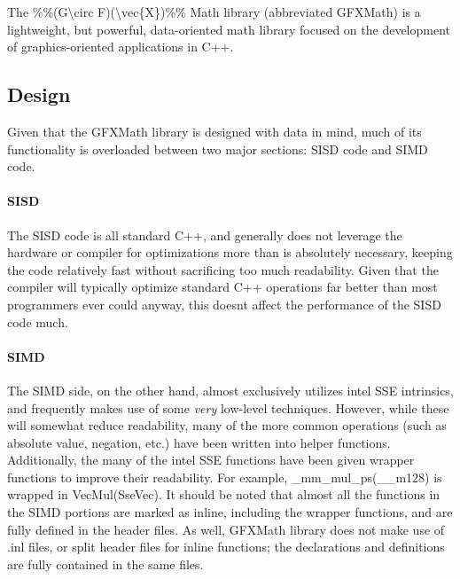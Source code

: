 The \%\%(G\textbackslash{}circ F)(\textbackslash{}vec\{X\})\%\% Math library (abbreviated G\+F\+X\+Math) is a lightweight, but powerful, data-\/oriented math library focused on the development of graphics-\/oriented applications in C++.

\subsection*{Design}





Given that the G\+F\+X\+Math library is designed with data in mind, much of its functionality is overloaded between two major sections\+: S\+I\+S\+D code and S\+I\+M\+D code.

\paragraph*{S\+I\+S\+D}





The S\+I\+S\+D code is all standard C++, and generally does not leverage the hardware or compiler for optimizations more than is absolutely necessary, keeping the code relatively fast without sacrificing too much readability. Given that the compiler will typically optimize standard C++ operations far better than most programmers ever could anyway, this doesn\textquotesingle{}t affect the performance of the S\+I\+S\+D code much.

\paragraph*{S\+I\+M\+D}





The S\+I\+M\+D side, on the other hand, almost exclusively utilizes intel\textregistered{} S\+S\+E intrinsics, and frequently makes use of some {\itshape very} low-\/level techniques. However, while these will somewhat reduce readability, many of the more common operations (such as absolute value, negation, etc.) have been written into helper functions. Additionally, the many of the intel\textregistered{} S\+S\+E functions have been given wrapper functions to improve their readability. For example, {\ttfamily \+\_\+mm\+\_\+mul\+\_\+ps(\+\_\+\+\_\+m128)} is wrapped in {\ttfamily Vec\+Mul(\+Sse\+Vec)}. It should be noted that almost all the functions in the S\+I\+M\+D portions are marked as {\ttfamily inline}, including the wrapper functions, and are fully defined in the header files. As well, G\+F\+X\+Math library does not make use of .inl files, or split header files for {\ttfamily inline} functions; the declarations and definitions are fully contained in the same files.

